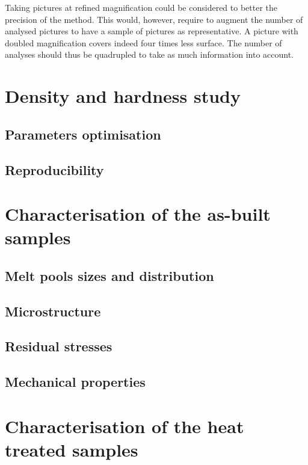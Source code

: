 Taking pictures at refined magnification could be considered to better the precision of the method. This would, however, require to augment the number of analysed pictures to have a sample of pictures as representative. A picture with doubled magnification covers indeed four times less surface. The number of analyses should thus be quadrupled to take as much information into account.\\

\section{Density and hardness study}

\subsection{Parameters optimisation}

\subsection{Reproducibility}

\section{Characterisation of the as-built samples}

\subsection{Melt pools sizes and distribution}

\subsection{Microstructure}

\subsection{Residual stresses}

\subsection{Mechanical properties}

\section{Characterisation of the heat treated samples}

